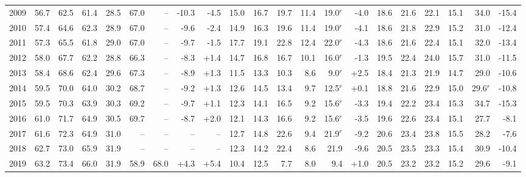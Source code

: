 \begin{table}[H]
{\begin{tabular}[t]{lrrrrrrrrrrrrrrrrrrrr}
\hspace{1em}2009 & 56.7 & 62.5 & 61.4 & 28.5 & 67.0 & -- & -10.3 & -4.5 & 15.0 & 16.7 & 19.7 & 11.4 & 19.0$^{r}$ & -4.0 & 18.6 & 21.6 & 22.1 & 15.1 & 34.0 & -15.4\\
\hspace{1em}2010 & 57.4 & 64.6 & 62.3 & 28.9 & 67.0 & -- & -9.6 & -2.4 & 14.9 & 16.3 & 19.6 & 11.4 & 19.0$^{r}$ & -4.1 & 18.6 & 21.8 & 22.9 & 15.2 & 31.0 & -12.4\\
\hspace{1em}2011 & 57.3 & 65.5 & 61.8 & 29.0 & 67.0 & -- & -9.7 & -1.5 & 17.7 & 19.1 & 22.8 & 12.4 & 22.0$^{r}$ & -4.3 & 18.6 & 21.6 & 22.4 & 15.1 & 32.0 & -13.4\\
\hspace{1em}2012 & 58.0 & 67.7 & 62.2 & 28.8 & 66.3 & -- & -8.3 & +1.4 & 14.7 & 16.8 & 16.7 & 10.1 & 16.0$^{r}$ & -1.3 & 19.5 & 22.4 & 24.0 & 15.7 & 31.0 & -11.5\\
\hspace{1em}2013 & 58.4 & 68.6 & 62.4 & 29.6 & 67.3 & -- & -8.9 & +1.3 & 11.5 & 13.3 & 10.3 & 8.6 & 9.0$^{r}$ & +2.5 & 18.4 & 21.3 & 21.9 & 14.7 & 29.0 & -10.6\\
\hspace{1em}2014 & 59.5 & 70.0 & 64.0 & 30.2 & 68.7 & -- & -9.2 & +1.3 & 12.6 & 14.5 & 13.4 & 9.7 & 12.5$^{r}$ & +0.1 & 18.8 & 21.6 & 22.9 & 15.0 & 29.6$^{r}$ & -10.8\\
\hspace{1em}2015 & 59.5 & 70.3 & 63.9 & 30.3 & 69.2 & -- & -9.7 & +1.1 & 12.3 & 14.1 & 16.5 & 9.2 & 15.6$^{r}$ & -3.3 & 19.4 & 22.2 & 23.4 & 15.3 & 34.7 & -15.3\\
\hspace{1em}2016 & 61.0 & 71.7 & 64.9 & 30.5 & 69.7 & -- & -8.7 & +2.0 & 12.1 & 14.3 & 16.6 & 9.2 & 15.6$^{r}$ & -3.5 & 19.6 & 22.6 & 23.4 & 15.1 & 27.7 & -8.1\\
\hspace{1em}2017 & 61.6 & 72.3 & 64.9 & 31.0 & -- & -- & -- & -- & 12.7 & 14.8 & 22.6 & 9.4 & 21.9$^{r}$ & -9.2 & 20.6 & 23.4 & 23.8 & 15.5 & 28.2 & -7.6\\
\hspace{1em}2018 & 62.7 & 73.0 & 65.9 & 31.9 & -- & -- & -- & -- & 12.3 & 14.2 & 22.4 & 8.6 & 21.9 & -9.6 & 20.5 & 23.5 & 23.3 & 15.4 & 30.9 & -10.4\\
\hspace{1em}2019 & 63.2 & 73.4 & 66.0 & 31.9 & 58.9 & 68.0 & +4.3 & +5.4 & 10.4 & 12.5 & 7.7 & 8.0 & 9.4 & +1.0 & 20.5 & 23.2 & 23.2 & 15.2 & 29.6 & -9.1\\

\end{tabular}}
\end{table}
